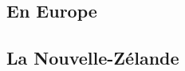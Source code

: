         \subsection{En Europe}
        \cite{antoljak2012subsurface}
        \cite{Toll}
        \lipsum[1]
        \subsection{La Nouvelle-Zélande}
